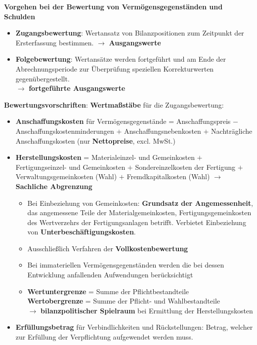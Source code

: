 \textbf{Vorgehen bei der Bewertung von Vermögensgegenständen und Schulden}
\begin{itemize}
	\item \textbf{Zugangsbewertung}: Wertansatz von Bilanzpositionen zum Zeitpunkt der Ersterfassung bestimmen. $\rightarrow$ \textbf{Ausgangswerte}
	\item \textbf{Folgebewertung}: Wertansätze werden fortgeführt und am Ende der Abrechnungsperiode zur Überprüfung speziellen Korrekturwerten gegenübergestellt. \\
	$\rightarrow$ \textbf{fortgeführte Ausgangswerte}
\end{itemize}
\bigskip
\textbf{Bewertungsvorschriften}: \textbf{Wertmaßstäbe} für die Zugangsbewertung:
\begin{itemize}
	\item \textbf{Anschaffungskosten} für Vermögensgegenstände = Anschaffungspreis $-$ Anschaffungskostenminderungen $+$ Anschaffungsnebenkosten $+$ Nachträgliche Anschaffungskosten (nur \textbf{Nettopreise}, excl. MwSt.)
	\item \textbf{Herstellungskosten} = Materialeinzel- und Gemeinkosten $+$ Fertigungseinzel- und Gemeinkosten $+$ Sondereinzelkosten der Fertigung $+$ Verwaltungsgemeinkosten (Wahl) $+$ Fremdkapitalkosten (Wahl) $\rightarrow$ \textbf{Sachliche Abgrenzung}
	\begin{itemize}
		\item Bei Einbeziehung von Gemeinkosten: \textbf{Grundsatz der Angemessenheit}, das angemessene Teile der Materialgemeinkosten, Fertigungsgemeinkosten des Wertverzehrs der Fertigungsanlagen betrifft. Verbietet Einbeziehung von \textbf{Unterbeschäftigungskosten}.
		\item Ausschließlich Verfahren der \textbf{Vollkostenbewertung}
		\item Bei immateriellen Vermögensgegenständen werden die bei dessen Entwicklung anfallenden
		Aufwendungen berücksichtigt
		\item \textbf{Wertuntergrenze} = Summe der Pflichtbestandteile\\
		\textbf{Wertobergrenze} = Summe der Pflicht- und Wahlbestandteile\\
		$\rightarrow$ \textbf{bilanzpolitischer Spielraum} bei Ermittlung der Herstellungskosten
	\end{itemize}
	\item \textbf{Erfüllungsbetrag} für Verbindlichkeiten und Rückstellungen: Betrag, welcher zur Erfüllung der Verpflichtung aufgewendet werden muss.\\

\end{itemize}
